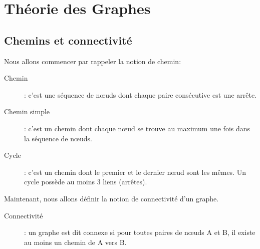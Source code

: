 \chapter{Théorie des Graphes}


\section{Chemins et connectivité}
Nous allons commencer par rappeler la notion de chemin:
	\begin{description}
	\item[Chemin]: c'est une séquence de n\oe uds dont chaque paire consécutive est une arrête.
    \item[Chemin simple]: c'est un chemin dont chaque n\oe ud se trouve au maximum une fois dans la séquence de n\oe uds.
    \item[Cycle]: c'est un chemin dont le premier et le dernier n\oe ud sont les mêmes. Un cycle possède au moins 3 liens (arrêtes).\\
	\end{description}

Maintenant, nous allons définir la notion de connectivité d'un graphe.
	\begin{description}
    \item[Connectivité]: un graphe est dit connexe si pour toutes paires de n\oe uds A et B, il existe au moins un chemin de A vers B.\\
	\end{description}

